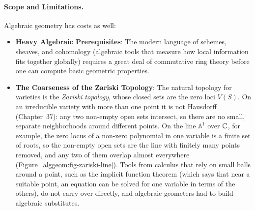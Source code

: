 \paragraph{Scope and Limitations.}
Algebraic geometry has costs as well:
\begin{itemize}
  \item \textbf{Heavy Algebraic Prerequisites}: The modern language of schemes, sheaves, and cohomology (algebraic tools that measure how local information fits together globally) requires a great deal of commutative ring theory before one can compute basic geometric properties.
  \item \textbf{The Coarseness of the Zariski Topology}: The natural topology for varieties is the \emph{Zariski topology}, whose closed sets are the zero loci $V(S)$. On an irreducible variety with more than one point it is not Hausdorff (Chapter~37): any two non-empty open sets intersect, so there are no small, separate neighborhoods around different points. On the line $\mathbb{A}^1$ over $\mathbb{C}$, for example, the zero locus of a non-zero polynomial in one variable is a finite set of roots, so the non-empty open sets are the line with finitely many points removed, and any two of them overlap almost everywhere (Figure~\ref{alggeom:fig-zariski-line}). Tools from calculus that rely on small balls around a point, such as the implicit function theorem (which says that near a suitable point, an equation can be solved for one variable in terms of the others), do not carry over directly, and algebraic geometers had to build algebraic substitutes.
\end{itemize}

